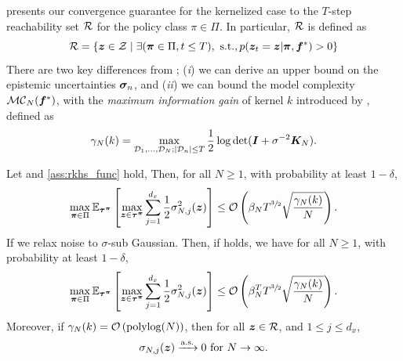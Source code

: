  presents our convergence guarantee for the kernelized case to the $T$-step reachability set ${\mathcal{R}}$ for the policy class $\pi \in \Pi$. In particular, ${\mathcal{R}}$ is defined as
\begin{equation*}
   {\mathcal{R}} = \{ {\bm{z}} \in {\mathcal{Z}} \mid \exists ({\bm{\pi}} \in \Pi, t \leq T), \text{ s.t.}, p({\bm{z}}_t={\bm{z}}|{\bm{\pi}}, {\bm{f}}^*) > 0\} 
\end{equation*}
There are two key differences from ; (\emph{i}) we can derive an upper bound on the epistemic uncertainties ${\bm{\sigma}}_n$, and (\emph{ii}) we can bound the model complexity ${{\mathcal{M}} {\mathcal{C}}}_{N}({\bm{f}}^*)$, with the {\em maximum information gain} of kernel $k$ introduced by \citet{srinivas}, defined as
\begin{equation*}
    {\gamma}_{N}(k) = \max_{{\mathcal{D}}_1, \dots, {\mathcal{D}}_N; |{\mathcal{D}}_n| \leq T}  \frac{1}{2}\log\det({\bm{I}} + \sigma^{-2} {\bm K}_N).
\end{equation*}
\begin{theorem}
\label{thm:gp_theorem}
Let  and \ref{ass:rkhs_func} hold, Then, for all $N \geq 1$, with probability at least $1-\delta$,
\begin{equation}
   \max_{{\bm{\pi}} \in \Pi} \mathbb{E}_{{\bm{\tau}}^{{\bm{\pi}}}}\left[ \max_{{\bm{z}} \in {\bm{\tau}}^{{\bm{\pi}}}}\sum^{d_x}_{j=1} \frac{1}{2}\sigma_{N, j}^2({\bm{z}}) \right] \le {\mathcal{O}} \left(\beta_N T^{\sfrac{3}{2}}\sqrt{\frac{{\gamma}_{N}(k)}{N}}\right)
    \label{eq:bound_gp_general}.
\end{equation}
If we relax noise  to $\sigma$-sub Gaussian. 
Then, if  holds, we have for all $N \geq 1$, with probability at least $1-\delta$,
\begin{equation}
   \max_{{\bm{\pi}} \in \Pi} \mathbb{E}_{{\bm{\tau}}^{{\bm{\pi}}}}\left[ \max_{{\bm{z}} \in {\bm{\tau}}^{{\bm{\pi}}}}\sum^{d_x}_{j=1} \frac{1}{2}\sigma_{N, j}^2({\bm{z}}) \right] \le {\mathcal{O}} \left(\beta^{T}_{N} T^{\sfrac{3}{2}}\sqrt{\frac{{\gamma}_{N}(k)}{N}}\right) \label{eq:bound_gp}.
\end{equation}
Moreover, 
if $\gamma_N(k) = {\mathcal{O}}\left(\text{polylog}(N)\right)$, then for all ${\bm{z}} \in {\mathcal{R}}$, and $1 \leq j \leq d_x$,
    \begin{equation}
    \sigma_{N, j}({\bm{z}}) \xrightarrow[]{\mathrm{a.s.}} 0 \text{ for } N \to \infty \label{eq:reachabilty_set_convergence}.
\end{equation}
\end{theorem}
